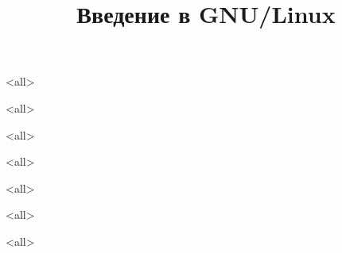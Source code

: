 
\title{Введение в GNU/Linux}








\frame{
	\tableofcontents
}
\mode<all>{}

\mode<all>{}

\mode<all>{}

\mode<all>{}

\mode<all>{}

\mode<all>{}

\mode<all>{}


